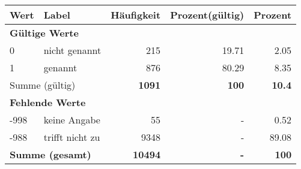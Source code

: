      \begin{longtable}{lXrrr}
     \toprule
     \textbf{Wert} & \textbf{Label} & \textbf{Häufigkeit} & \textbf{Prozent(gültig)} & \textbf{Prozent} \\
     \endhead
     \midrule
     \multicolumn{5}{l}{\textbf{Gültige Werte}}\\

     0 &
     \multicolumn{1}{X}{ nicht genannt   } &


       \num{215} &
       \num[round-mode=places,round-precision=2]{19.71} &
         \num[round-mode=places,round-precision=2]{2.05} \\

     1 &
     \multicolumn{1}{X}{ genannt   } &


       \num{876} &
       \num[round-mode=places,round-precision=2]{80.29} &
         \num[round-mode=places,round-precision=2]{8.35} \\
     \midrule
     \multicolumn{2}{l}{Summe (gültig)} &
       \textbf{\num{1091}} &
     \textbf{\num{100}} &
       \textbf{\num[round-mode=places,round-precision=2]{10.4}} \\
     \multicolumn{5}{l}{\textbf{Fehlende Werte}}\\
       -998 &
       keine Angabe &
         \num{55} &
        - &
         \num[round-mode=places,round-precision=2]{0.52} \\
       -988 &
       trifft nicht zu &
         \num{9348} &
        - &
         \num[round-mode=places,round-precision=2]{89.08} \\
     \midrule
     \multicolumn{2}{l}{\textbf{Summe (gesamt)}} &
          \textbf{\num{10494}} &
        \textbf{-} &
        \textbf{\num{100}} \\
     \bottomrule
     \end{longtable}
     
